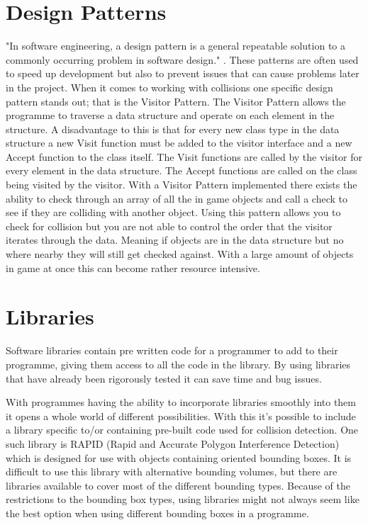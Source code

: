 \documentclass{scrartcl}
\begin{document}
	\section{Design Patterns}
	"In software engineering, a design pattern is a general repeatable solution to a commonly occurring problem in software design." \cite{designpatternsandrefactoring_2018}. These patterns are often used to speed up development but also to prevent issues that can cause problems later in the project. When it comes to working with collisions one specific design pattern stands out; that is the Visitor Pattern\cite{gamma1995design}. The Visitor Pattern allows the programme to traverse a data structure and operate on each element in the structure. A disadvantage to this is that for every new class type in the data structure a new Visit function must be added to the visitor interface and a new Accept function to the class itself\cite{horsfall2012verifying}. The Visit functions are called by the visitor for every element in the data structure. The Accept functions are called on the class being visited by the visitor. With a Visitor Pattern implemented there exists the ability to check through an array of all the in game objects and call a check to see if they are colliding with another object. Using this pattern allows you to check for collision but you are not able to control the order that the visitor iterates through the data\cite{horsfall2012verifying}. Meaning if objects are in the data structure but no where nearby they will still get checked against. With a large amount of objects in game at once this can become rather resource intensive.
	
	\section{Libraries}
	Software libraries contain pre written code for a programmer to add to their programme, giving them access to all the code in the library. By using libraries that have already been rigorously tested it can save time and bug issues.
	
	With programmes having the ability to incorporate libraries smoothly into them it opens a whole world of different possibilities\cite{kula2017exploratory}. With this it's possible to include a library specific to/or containing pre-built code used for collision detection. One such library is RAPID (Rapid and Accurate Polygon Interference Detection)\cite{gottschalk1996obbtree} which is designed for use with objects containing oriented bounding boxes. It is difficult to use this library with alternative bounding volumes, but there are libraries available to cover most of the different bounding types. Because of the restrictions to the bounding box types, using libraries might not always seem like the best option when using different bounding boxes in a programme.
	
\end{document}
